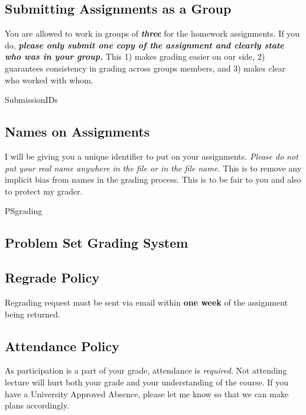 \documentclass[11pt]{article}
\begin{document}
\subsection*{Submitting Assignments as a Group}
You are allowed to work in groups of \textit{\textbf{three}} for the homework assignments. If you do, \textit{\textbf{please only submit one copy of the assignment and clearly state who was in your group.}} This 1) makes grading easier on our side, 2) guarantees consistency in grading across groups members, and 3) makes clear who worked with whom.

\begin{ToggleSect}{SubmissionIDs}
\subsection*{Names on Assignments}
I will be giving you a unique identifier to put on your assignments. \textit{Please do not put your real name anywhere in the file or in the file name.} This is to remove any implicit bias from names in the grading process. This is to be fair to you and also to protect my grader.
\end{ToggleSect}

\begin{ToggleSect}{PSgrading}
\subsection*{Problem Set Grading System}\label{subsec:PSgrading}

\end{ToggleSect}

\subsection*{Regrade Policy} Regrading request must be sent via email within \textbf{one week} of the assignment being returned.

\subsection*{Attendance Policy}
As participation is a part of your grade, attendance is \textit{required}. Not attending lecture will hurt both your grade and your understanding of the course. If you have a University Approved Absence, please let me know so that we can make plans accordingly.
\end{document}
